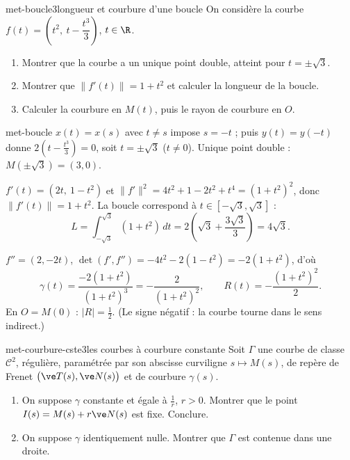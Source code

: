 \begin{exo}{met-boucle}{3}{longueur et courbure d'une boucle}
On considère la courbe $f(t)=\left(t^2,\ t-\dfrac{t^3}3\right)$, $t\in\R$.
\begin{enumerate}
\item Montrer que la courbe a un unique point double, atteint pour $t=\pm\sqrt3$.
\item Montrer que $\|f'(t)\|=1+t^2$ et calculer la longueur de la boucle.
\item Calculer la courbure en $M(t)$, puis le rayon de courbure en $O$.
\end{enumerate}
\end{exo}

\begin{corrige}{met-boucle}
 $x(t)=x(s)$ avec $t\neq s$ impose $s=-t$ ; puis $y(t)=y(-t)$ donne $2\left(t-\frac{t^3}3\right)=0$, soit $t=\pm\sqrt3$ ($t\neq0$). Unique point double : $M(\pm\sqrt3)=(3,0)$.

 $f'(t)=(2t,\ 1-t^2)$ et $\|f'\|^2=4t^2+1-2t^2+t^4=(1+t^2)^2$, donc $\|f'(t)\|=1+t^2$. La boucle correspond à $t\in[-\sqrt3,\sqrt3]$ :
\[L=\int_{-\sqrt3}^{\sqrt3}(1+t^2)\,dt=2\left(\sqrt3+\frac{3\sqrt3}3\right)=4\sqrt3.\]

 $f''=(2,-2t)$, $\det(f',f'')=-4t^2-2(1-t^2)=-2(1+t^2)$, d'où
\[\gamma(t)=\frac{-2(1+t^2)}{(1+t^2)^3}=-\frac2{(1+t^2)^2},\qquad R(t)=-\frac{(1+t^2)^2}2.\]
En $O=M(0)$ : $|R|=\frac12$. (Le signe négatif : la courbe tourne dans le sens indirect.)
\end{corrige}

\begin{exo}{met-courbure-cste}{3}{les courbes à courbure constante}
Soit $\Gamma$ une courbe de classe $\mathcal C^2$, régulière, paramétrée par son abscisse curviligne $s\mapsto M(s)$, de repère de Frenet $\big(\ve T(s),\ve N(s)\big)$ et de courbure $\gamma(s)$.
\begin{enumerate}
\item On suppose $\gamma$ constante et égale à $\frac1r$, $r>0$. Montrer que le point $I(s)=M(s)+r\ve N(s)$ est fixe. Conclure.
\item On suppose $\gamma$ identiquement nulle. Montrer que $\Gamma$ est contenue dans une droite.
\end{enumerate}
\end{exo}

